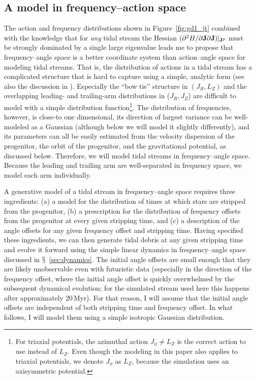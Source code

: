 \documentclass[12pt,preprint]{aastex}
\renewcommand{\figurename}{Figure}
\newcommand{\sectionname}{$\mathsection$}
\renewcommand{\vec}[1]{\ensuremath{\mathbf{#1}}}
\newcommand{\vecj}{\ensuremath{\vec{J}}}
\newcommand{\Myr}{\ensuremath{\,\mathrm{Myr}}}
\begin{document}
\subsection{A model in frequency--action space}\label{sec:modeloa}

The action and frequency distributions shown in
\figurename~\ref{fig:gd1_jt} combined with the knowledge that for
\emph{any} tidal stream the Hessian $(\partial^2 H / \partial \vecj
\partial \vecj)\large|_{\vecj^p}$ must be strongly dominated by a
single large eigenvalue leads me to propose that frequency--angle
space is a better coordinate system than action--angle space for
modeling tidal streams. That is, the distribution of actions in a
tidal stream has a complicated structure that is hard to capture using
a simple, analytic form (see also the discussion in
\citealt{Eyre11a}). Especially the ``bow tie'' structure in
$(J_R,L_Z)$ and the overlapping leading- and trailing-arm
distributions in ($J_R,J_Z$) are difficult to model with a simple
distribution function\footnote{For triaxial potentials, the azimuthal
  action $J_\phi \neq L_Z$ is the correct action to use instead of
  $L_Z$. Even though the modeling in this paper also applies to
  triaxial potentials, we denote $J_\phi$ as $L_Z$, because the
  simulation uses an axisymmetric potential.}. The distribution of
frequencies, however, is close-to one dimensional, its direction of
largest variance can be well-modeled as a Gaussian (although below we
will model it slightly differently), and its parameters can all be
easily estimated from the velocity dispersion of the progenitor, the
orbit of the progenitor, and the gravitational potential, as discussed
below. Therefore, we will model tidal streams in frequency--angle
space. Because the leading and trailing arm are well-separated in
frequency space, we model each arm individually.

A generative model of a tidal stream in frequency--angle space
requires three ingredients: (a) a model for the distribution of times
at which stars are stripped from the progenitor, (b) a prescription
for the distribution of frequency offsets from the progenitor at every
given stripping time, and (c) a description of the angle offsets for
any given frequency offset and stripping time. Having specified these
ingredients, we can then generate tidal debris at any given stripping
time and evolve it forward using the simple linear dynamics in
frequency--angle space discussed in
\sectionname~\ref{sec:dynamics}. The initial angle offsets are small
enough that they are likely unobservable even with futuristic data
(especially in the direction of the frequency offset, where the
initial angle offset is quickly overwhelmed by the subsequent
dynamical evolution; for the simulated stream used here this happens
after approximately $20\Myr$). For that reason, I will assume that the
initial angle offsets are independent of both stripping time and
frequency offset. In what follows, I will model them using a simple
isotropic Gaussian distribution.
\end{document}
